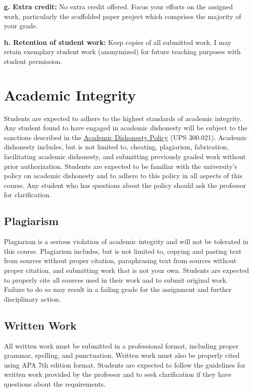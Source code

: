 \documentclass[12pt]{article}     %
\begin{document}
\vspace{1em}
\noindent \textbf{g. Extra credit:}
No extra credit offered. Focus your efforts on the assigned work, particularly the scaffolded paper project which comprises the majority of your grade.

\vspace{1em}
\noindent \textbf{h. Retention of student work:}
Keep copies of all submitted work. I may retain exemplary student work (anonymized) for future teaching purposes with student permission.

\section{Academic Integrity}
Students are expected to adhere to the highest standards of academic integrity. Any student found to have engaged in academic dishonesty will be subject to the sanctions described in the \href{https://www.fullerton.edu/senate/publications_policies_resolutions/ups/UPS%20300/UPS%20300.021.pdf}{Academic Dishonesty Policy} (UPS 300.021). Academic dishonesty includes, but is not limited to, cheating, plagiarism, fabrication, facilitating academic dishonesty, and submitting previously graded work without prior authorization. Students are expected to be familiar with the university's policy on academic dishonesty and to adhere to this policy in all aspects of this course. Any student who has questions about the policy should ask the professor for clarification.

\subsection*{Plagiarism}
Plagiarism is a serious violation of academic integrity and will not be tolerated in this course. Plagiarism includes, but is not limited to, copying and pasting text from sources without proper citation, paraphrasing text from sources without proper citation, and submitting work that is not your own. Students are expected to properly cite all sources used in their work and to submit original work. Failure to do so may result in a failing grade for the assignment and further disciplinary action.

\subsection*{Written Work}
All written work must be submitted in a professional format, including proper grammar, spelling, and punctuation. Written work must also be properly cited using APA 7th edition format. Students are expected to follow the guidelines for written work provided by the professor and to seek clarification if they have questions about the requirements.
\end{document}
